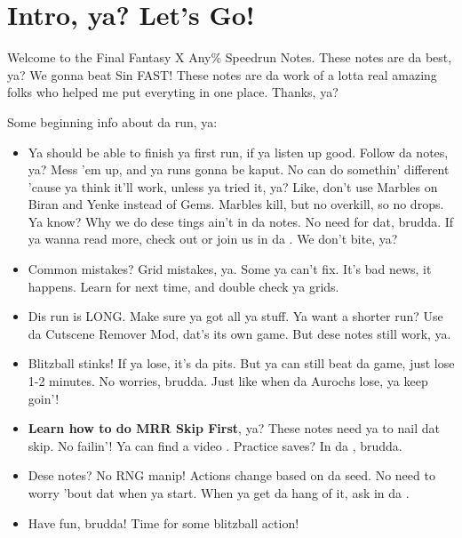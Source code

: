 \chapter{Intro, ya? Let's Go!}

\author{Wakka and all da Blitzball Fans, Brudda!}

Welcome to the Final Fantasy X Any\% Speedrun Notes. These notes are da best, ya? We gonna beat Sin FAST!
\bothnewline
These notes are da work of a lotta real amazing folks who helped me put everyting in one place. Thanks, ya?

Some beginning info about da run, ya:

\begin{itemize}
    \item Ya should be able to finish ya first run, if ya listen up good. Follow da notes, ya? Mess 'em up, and ya runs gonna be kaput. No can do somethin' different 'cause ya think it'll work, unless ya tried it, ya? Like, don't use Marbles on Biran and Yenke instead of Gems. Marbles kill, but no overkill, so no drops. Ya know? Why we do dese tings ain't in da notes. No need for dat, brudda. If ya wanna read more, check out  or join us in da . We don't bite, ya?
    \item Common mistakes? Grid mistakes, ya. Some ya can't fix. It's bad news, it happens. Learn for next time, and double check ya grids.
    \item Dis run is LONG. Make sure ya got all ya stuff. Ya want a shorter run? Use da Cutscene Remover Mod, dat's its own game. But dese notes still work, ya.
    \item Blitzball stinks! If ya lose, it's da pits. But ya can still beat da game, just lose 1-2 minutes. No worries, brudda. Just like when da Aurochs lose, ya keep goin'!
    \item \textbf{Learn how to do MRR Skip First}, ya? These notes need ya to nail dat skip. No failin'! Ya can find a video . Practice saves? In da , brudda.
    \item Dese notes? No RNG manip! Actions change based on da seed. No need to worry 'bout dat when ya start. When ya get da hang of it, ask in da .
    \item Have fun, brudda! Time for some blitzball action!
\end{itemize}

